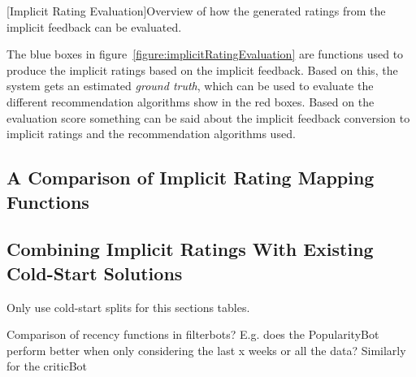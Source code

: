\begin{center}
    [Implicit Rating Evaluation]{Overview of how the generated ratings from the implicit feedback can be evaluated.}
  	\label{figure:implicitRatingEvaluation}
  \end{center}

The blue boxes in figure~\ref{figure:implicitRatingEvaluation} are functions used to produce the implicit ratings based on the implicit feedback. Based on this, the system gets an estimated \emph{ground truth}, which can be used to evaluate the different recommendation algorithms show in the red boxes. Based on the evaluation score something can be said about the implicit feedback conversion to implicit ratings and the recommendation algorithms used.


\subsection{A Comparison of Implicit Rating Mapping Functions}



\subsection{Combining Implicit Ratings With Existing Cold-Start Solutions}


Only use cold-start splits for this sections tables.

Comparison of recency functions in filterbots?
E.g. does the PopularityBot perform better when only considering the last x weeks or all the data?
Similarly for the criticBot


